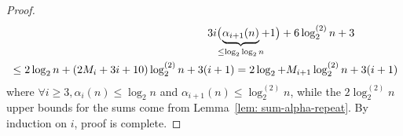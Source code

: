 \begin{proof}
\begin{equation*}
\begin{aligned}
	& \hspace{18em} 3i\big(\hspace{-5.5pt}\underbrace{\alpha_{i+1}(n)}_{\le \log_2\log_2n}\hspace{-4pt} + 1\big) + 6\log_2^{(2)}n + 3 \\
	& \le 2\log_2n + (2M_i + 3i + 10)\log_2^{(2)}n + 3(i + 1)
	= 2\log_2 + M_{i+1}\log_2^{(2)}n + 3(i + 1)
	\end{aligned}
	\end{equation*}
	where $\forall i\ge 3, \alpha_i(n)\le \log_2n$ and $\alpha_{i+1}(n)\le \log_2^{(2)}n$, while the $2\log_2^{(2)}n$ upper bounds for the sums come from Lemma~\ref{lem: sum-alpha-repeat}.
	By induction on $i$, proof is complete.
\end{proof}

